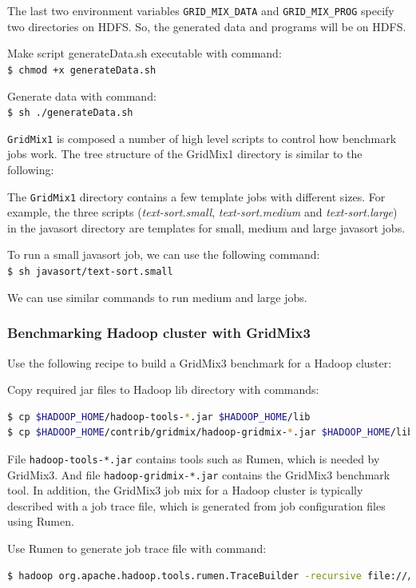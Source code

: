The last two environment variables \verb|GRID_MIX_DATA| and \verb|GRID_MIX_PROG| specify two directories on HDFS. So, the generated data and programs will be on HDFS.

Make script generateData.sh executable with command: \\
\verb|$ chmod +x generateData.sh|

Generate data with command: \\
\verb|$ sh ./generateData.sh|

\verb|GridMix1| is composed a number of high level scripts to control how benchmark jobs work. The tree structure of the GridMix1 directory is similar to the following:

The \verb|GridMix1| directory contains a few template jobs with different sizes. For example, the three scripts (\emph{text-sort.small}, \emph{text-sort.medium} and \emph{text-sort.large}) in the javasort directory are templates for small, medium and large javasort jobs.

To run a small javasort job, we can use the following command:\\
\verb|$ sh javasort/text-sort.small|

We can use similar commands to run medium and large jobs.

\subsubsection*{Benchmarking Hadoop cluster with GridMix3}
Use the following recipe to build a GridMix3 benchmark for a Hadoop cluster:

Copy required jar files to Hadoop lib directory with commands:
\lstset{style=bashstyle}
\begin{lstlisting}[language=bash]
$ cp $HADOOP_HOME/hadoop-tools-*.jar $HADOOP_HOME/lib
$ cp $HADOOP_HOME/contrib/gridmix/hadoop-gridmix-*.jar $HADOOP_HOME/lib
\end{lstlisting}

File \verb|hadoop-tools-*.jar| contains tools such as Rumen, which is needed by GridMix3. And file \verb|hadoop-gridmix-*.jar| contains the GridMix3 benchmark tool. In addition, the GridMix3 job mix for a Hadoop cluster is typically described with a job trace file, which is generated from job configuration files using Rumen.

Use Rumen to generate job trace file with command:
\lstset{style=bashstyle}
\begin{lstlisting}[language=bash]
$ hadoop org.apache.hadoop.tools.rumen.TraceBuilder -recursive file:///tmp/jobtrace.json file:///tmp/topology.out file:///usr/local/hadoop/logs/history/done
\end{lstlisting}

